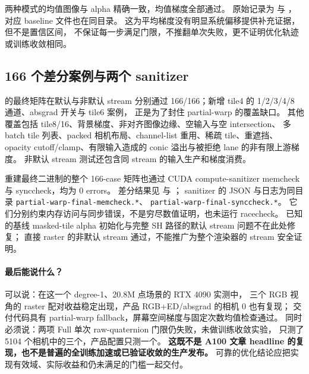 两种模式的均值图像与 alpha 精确一致，均值梯度全部通过。
原始记录为 
与 ，
对应 baseline 文件也在同目录。
这为平均梯度没有明显系统偏移提供补充证据，但不是置信区间，
不保证每一步满足门限，不推翻单次失败，更不证明优化轨迹或训练收敛相同。

\subsection{166 个差分案例与两个 sanitizer}

 的最终矩阵在默认与非默认 stream
分别通过 166/166；新增 tile4 的 1/2/3/4/8 通道、absgrad 开关与 tile6 案例，
正是为了封住 partial-warp 的覆盖缺口。
其他覆盖包括 tile8/16、背景梯度、非对齐图像边缘、空输入与空 intersection、
多 batch tile 列表、packed 相机布局、channel-list 重用、稀疏 tile、重遮挡、
opacity cutoff/clamp、有限输入造成的 conic 溢出与被拒绝 lane 的非有限上游梯度。
非默认 stream 测试还包含同 stream 的输入生产和梯度消费。

重建最终二进制的整个 166-case 矩阵也通过 CUDA compute-sanitizer
memcheck 与 synccheck，均为 0 errors。
差分结果见 
与 ；
sanitizer 的 JSON 与日志为同目录
\texttt{partial-warp-final-memcheck.*}、
\texttt{partial-warp-final-synccheck.*}。
它们分别约束内存访问与同步错误，不是穷尽数值证明，也未运行 racecheck。
已知的基线 masked-tile alpha 初始化与完整 SH 路径的默认 stream 问题不在此处修复；
直接 raster 的非默认 stream 通过，不能推广为整个渲染器的 stream 安全证明。

\paragraph{最后能说什么？}
可以说：在这一个 degree-1、20.8M 点场景的 RTX 4090 实测中，
三个 RGB 视角的 raster 配对收益稳定出现，产品 RGB+ED/absgrad 的相机 0 也有复现；
交付代码具有 partial-warp fallback，屏幕空间梯度与固定次数均值检查通过。
同时必须说：两项 Full 单次 raw-quaternion 门限仍失败，未做训练收敛实验，
只测了 5104 个相机中的三个，产品配置只测一个。
\textbf{这既不是 A100 文章 headline 的复现，也不是普遍的全训练加速或已验证收敛的生产发布。}
可靠的优化结论应把实现有效域、实际收益和仍未满足的门槛一起交付。
